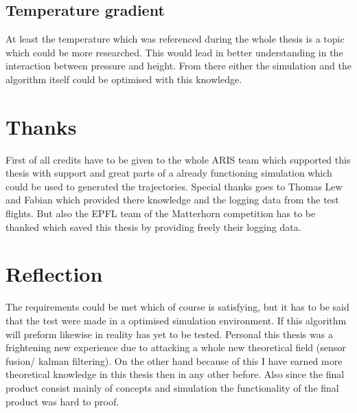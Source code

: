 \subsection{Temperature gradient}
At least the temperature which was referenced during the whole thesis is a topic which could be more researched.
This would lead in better understanding in the interaction between pressure and height.
From there either the simulation and the algorithm itself could be optimised with this knowledge.

\section{Thanks}
First of all credits have to be given to the whole ARIS team which supported this thesis with support
and great parts of a already functioning simulation which could be used to generated the trajectories.
Special thanks goes to Thomas Lew and Fabian  which provided there knowledge and the logging data from the test flights.
But also the EPFL team of the Matterhorn competition has to be thanked which saved this thesis by providing freely their logging data.

\section{Reflection}
The requirements could be met which of course is satisfying, but it has to be said that the test were made in a optimised simulation environment.
If this algorithm will preform likewise in reality has yet to be tested.
Personal this thesis was a frightening new experience due to attacking a whole new theoretical field (sensor fusion/ kalman filtering).
On the other hand because of this I have earned more theoretical knowledge in this thesis then in any other before.
Also since the final product consist mainly of concepts and simulation the functionality of the final product was hard to proof.
